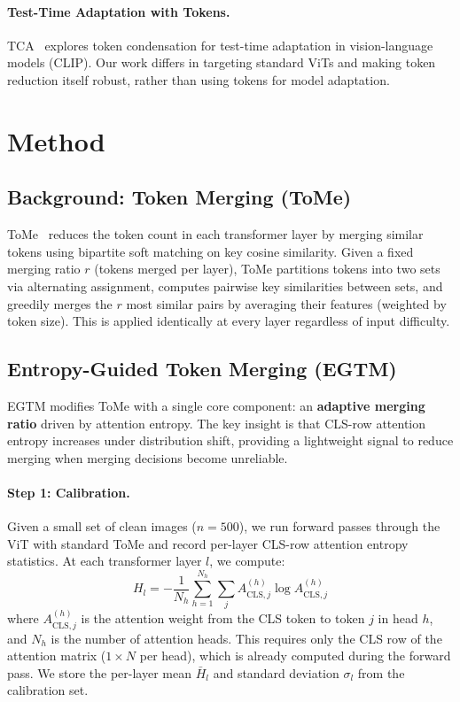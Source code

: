 \documentclass{article}
\newcommand{\ours}{EGTM}
\begin{document}
\paragraph{Test-Time Adaptation with Tokens.}
TCA~\citep{wang2025tca} explores token condensation for test-time adaptation in vision-language models (CLIP). Our work differs in targeting standard ViTs and making token reduction itself robust, rather than using tokens for model adaptation.

\section{Method}
\label{sec:method}

\subsection{Background: Token Merging (ToMe)}

ToMe~\citep{bolya2023token} reduces the token count in each transformer layer by merging similar tokens using bipartite soft matching on key cosine similarity. Given a fixed merging ratio $r$ (tokens merged per layer), ToMe partitions tokens into two sets via alternating assignment, computes pairwise key similarities between sets, and greedily merges the $r$ most similar pairs by averaging their features (weighted by token size). This is applied identically at every layer regardless of input difficulty.

\subsection{Entropy-Guided Token Merging (\ours{})}

\ours{} modifies ToMe with a single core component: an \textbf{adaptive merging ratio} driven by attention entropy. The key insight is that CLS-row attention entropy increases under distribution shift, providing a lightweight signal to reduce merging when merging decisions become unreliable.

\paragraph{Step 1: Calibration.}
Given a small set of clean images ($n{=}500$), we run forward passes through the ViT with standard ToMe and record per-layer CLS-row attention entropy statistics. At each transformer layer $l$, we compute:
\begin{equation}
H_l = -\frac{1}{N_h} \sum_{h=1}^{N_h} \sum_{j} A^{(h)}_{\text{CLS},j} \log A^{(h)}_{\text{CLS},j}
\end{equation}
where $A^{(h)}_{\text{CLS},j}$ is the attention weight from the CLS token to token $j$ in head $h$, and $N_h$ is the number of attention heads. This requires only the CLS row of the attention matrix ($1 \times N$ per head), which is already computed during the forward pass. We store the per-layer mean $\bar{H}_l$ and standard deviation $\sigma_l$ from the calibration set.
\end{document}
